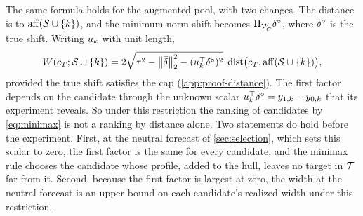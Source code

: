 \noindent
The same formula holds for the augmented pool, with two changes. The
distance is to $\operatorname{aff}(\mathcal S\cup\{k\})$, and the minimum-norm shift
becomes $\Pi_{\mathcal V_C'}\delta^\circ$, where $\delta^\circ$ is the true
shift. Writing $u_{k}$ with unit length,
\begin{equation}
  W(c_T;\mathcal S\cup\{k\})
  =2\sqrt{\tau^2-\left\|{\bar{\delta}}\right\|_2^2-(u_{k}^\top\delta^\circ)^2}\;
  \operatorname{dist}\bigl(c_T,\operatorname{aff}(\mathcal S\cup\{k\})\bigr),
  \label{eq:width-distance-aug}
\end{equation}
provided the true shift satisfies the cap (\cref{app:proof-distance}).
The first factor depends on the candidate through the unknown scalar
$u_{k}^\top\delta^\circ=y_{1,k}-y_{0,k}$ that its
experiment reveals. So under this restriction the ranking of candidates
by \eqref{eq:minimax} is not a ranking by distance alone. Two statements
do hold before the experiment. First, at the neutral forecast of
\cref{sec:selection}, which sets this scalar to zero, the first factor is
the same for every candidate, and the minimax rule chooses the candidate
whose profile, added to the hull, leaves no target in $\mathcal T$ far
from it. Second, because the first factor is largest at zero, the
width at the neutral forecast is an upper bound on each candidate's
realized width under this restriction.
